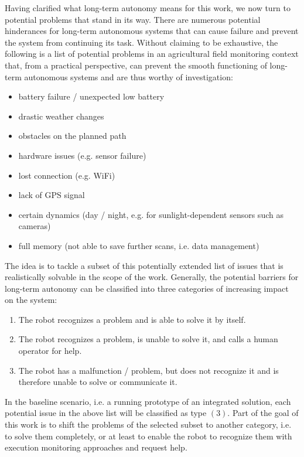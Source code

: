\documentclass[english, master, expose, utf8]{base/thesis_KBS}
\begin{document}
Having clarified what long-term autonomy means for this work, we now turn to potential problems that stand in its way.
There are numerous potential hinderances for long-term autonomous systems that can cause failure and prevent the system from continuing its task.
Without claiming to be exhaustive, the following is a list of potential problems in an agricultural field monitoring context that, from a practical perspective,
can prevent the smooth functioning of long-term autonomous systems and are thus worthy of investigation:
\begin{itemize}
    \item battery failure / unexpected low battery
    \item drastic weather changes
    \item obstacles on the planned path
    \item hardware issues (e.g. sensor failure)
    \item lost connection (e.g. WiFi)
    \item lack of GPS signal
    \item certain dynamics (day / night, e.g. for sunlight-dependent sensors such as cameras)
    \item full memory (not able to save further scans, i.e. data management)
\end{itemize}
The idea is to tackle a subset of this potentially extended list of issues that is realistically solvable in the scope of the work.
Generally, the potential barriers for long-term autonomy can be classified into three categories of increasing impact on the system:
\begin{enumerate}
    \item The robot recognizes a problem and is able to solve it by itself.
    \item The robot recognizes a problem, is unable to solve it, and calls a human operator for help.
    \item The robot has a malfunction / problem, but does not recognize it and is therefore unable to solve or communicate it.
\end{enumerate}
In the baseline scenario, i.e. a running prototype of an integrated solution, each potential issue in the above list will be classified as type $(3)$.
Part of the goal of this work is to shift the problems of the selected subset to another category, i.e. to solve them completely, 
or at least to enable the robot to recognize them with execution monitoring approaches and request help.
\end{document}
